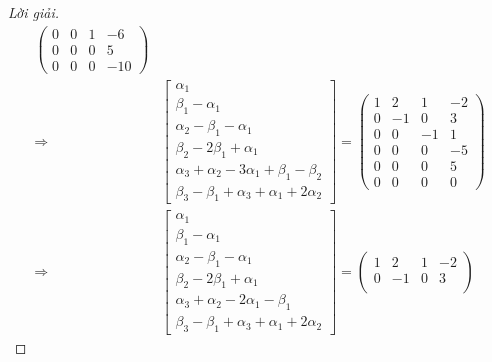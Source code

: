 \documentclass[class=linearalgebra,crop=false]{standalone}
\begin{document}
\begin{proof}[Lời giải]
\begin{align*}
\begin{pmatrix}
            0 & 0  & 1  & -6  \\
            0 & 0  & 0  & 5   \\
            0 & 0  & 0  & -10
        \end{pmatrix}                    \\
        \Longrightarrow &
        \begin{bmatrix}
            \alpha_{1}                                                    \\
            \beta_{1} - \alpha_{1}                                        \\
            \alpha_{2} - \beta_{1} - \alpha_{1}                           \\
            \beta_{2} - 2\beta_{1} + \alpha_{1}                           \\
            \alpha_{3} + \alpha_{2} - 3\alpha_{1} + \beta_{1} - \beta_{2} \\
            \beta_{3} - \beta_{1} + \alpha_{3} + \alpha_{1} + 2\alpha_{2}
        \end{bmatrix}=
        \begin{pmatrix}
            1 & 2  & 1  & -2 \\
            0 & -1 & 0  & 3  \\
            0 & 0  & -1 & 1  \\
            0 & 0  & 0  & -5 \\
            0 & 0  & 0  & 5  \\
            0 & 0  & 0  & 0
        \end{pmatrix}                    \\
        \Longrightarrow &
        \begin{bmatrix}
            \alpha_{1}                                        \\
            \beta_{1} - \alpha_{1}                            \\
            \alpha_{2} - \beta_{1} - \alpha_{1}               \\
            \beta_{2} - 2\beta_{1} + \alpha_{1}               \\
            \alpha_{3} + \alpha_{2} - 2\alpha_{1} - \beta_{1} \\
            \beta_{3} - \beta_{1} + \alpha_{3} + \alpha_{1} + 2\alpha_{2}
        \end{bmatrix}=
        \begin{pmatrix}
            1 & 2  & 1  & -2 \\
            0 & -1 & 0  & 3  \\

\end{pmatrix}
\end{align*}
\end{proof}
\end{document}
